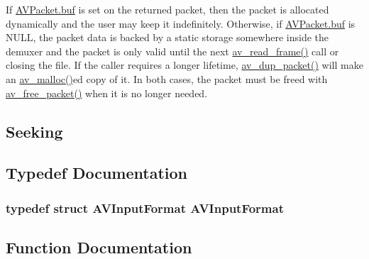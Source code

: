 If \hyperlink{struct_a_v_packet_a3bf81872813551fe9343dd0e09993e38}{A\+V\+Packet.\+buf} is set on the returned packet, then the packet is allocated dynamically and the user may keep it indefinitely. Otherwise, if \hyperlink{struct_a_v_packet_a3bf81872813551fe9343dd0e09993e38}{A\+V\+Packet.\+buf} is N\+U\+LL, the packet data is backed by a static storage somewhere inside the demuxer and the packet is only valid until the next \hyperlink{group__lavf__decoding_ga4fdb3084415a82e3810de6ee60e46a61}{av\+\_\+read\+\_\+frame()} call or closing the file. If the caller requires a longer lifetime, \hyperlink{group__lavc__packet_ga04c83bc8a685960564a169f3a050b915}{av\+\_\+dup\+\_\+packet()} will make an \hyperlink{group__lavu__mem_gacbca30ebc510a7e4156d66e7aceb2dc8}{av\+\_\+malloc()}ed copy of it. In both cases, the packet must be freed with \hyperlink{group__lavc__packet_gae65881462e78f98b268f34661d921ee0}{av\+\_\+free\+\_\+packet()} when it is no longer needed.\hypertarget{group__lavf__decoding_lavf_decoding_seek}{}\subsection{Seeking}\label{group__lavf__decoding_lavf_decoding_seek}


\subsection{Typedef Documentation}
\subsubsection[{\texorpdfstring{A\+V\+Input\+Format}{AVInputFormat}}]{\setlength{\rightskip}{0pt plus 5cm}typedef struct {\bf A\+V\+Input\+Format}  {\bf A\+V\+Input\+Format}}\hypertarget{group__lavf__decoding_ga41ac82c86aa114943b700dac564d2508}{}\label{group__lavf__decoding_ga41ac82c86aa114943b700dac564d2508}


\subsection{Function Documentation}
